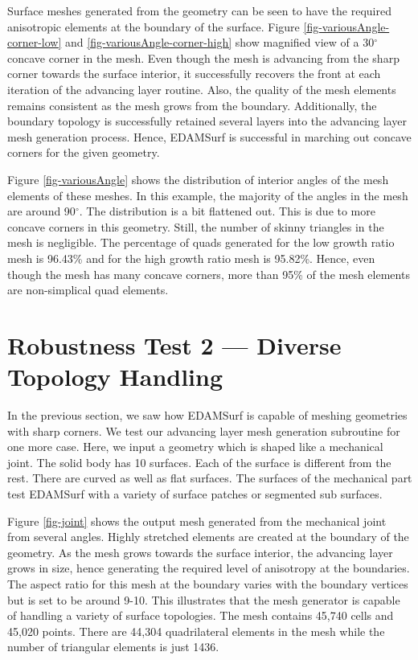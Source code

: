 Surface meshes generated from the geometry can be seen to have the required anisotropic elements at the boundary of the surface. Figure \ref{fig-variousAngle-corner-low} and \ref{fig-variousAngle-corner-high} show magnified view of a 30$^\circ$ concave corner in the mesh. Even though the mesh is advancing from the sharp corner towards the surface interior, it successfully recovers the front at each iteration of the advancing layer routine. Also, the quality of the mesh elements remains consistent as the mesh grows from the boundary. Additionally, the boundary topology is successfully retained several layers into the advancing layer mesh generation process. Hence, EDAMSurf is successful in marching out concave corners for the given geometry.

Figure \ref{fig-variousAngle} shows the distribution of interior angles of the mesh elements of these meshes. In this example, the majority of the angles in the mesh are around 90$^\circ$. The distribution is a bit flattened out. This is due to more concave corners in this geometry. Still, the number of skinny triangles in the mesh is negligible. The percentage of quads generated for the low growth ratio mesh is 96.43\% and for the high growth ratio mesh is 95.82\%. Hence, even though the mesh has many concave corners, more than 95\% of the mesh elements are non-simplical quad elements.

\section{Robustness Test 2 --- Diverse Topology Handling}

In the previous section, we saw how EDAMSurf is capable of meshing geometries with sharp corners. We test our advancing layer mesh generation subroutine for one more case. Here, we input a geometry which is shaped like a mechanical joint. The solid body has 10 surfaces. Each of the surface is different from the rest. There are curved as well as flat surfaces. The surfaces of the mechanical part test EDAMSurf with a variety of surface patches or segmented sub surfaces.

Figure \ref{fig-joint} shows the output mesh generated from the mechanical joint from several angles. Highly stretched elements are created at the boundary of the geometry. As the mesh grows towards the surface interior, the advancing layer grows in size, hence generating the required level of anisotropy at the boundaries. The aspect ratio for this mesh at the boundary varies with the boundary vertices but is set to be around 9-10. This illustrates that the mesh generator is capable of handling a variety of surface topologies. The mesh contains 45,740 cells and 45,020 points. There are 44,304 quadrilateral elements in the mesh while the number of triangular elements is just 1436.

